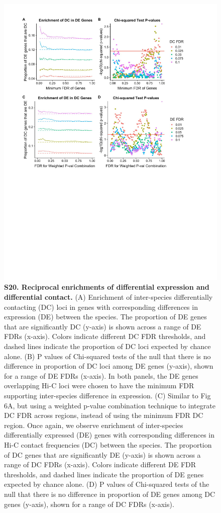 \begin{figure}[!htb]
\centering
\includegraphics[width=5in]{img/figS20.pdf}
\caption[Reciprocal enrichments of differential expression and differential contact.]{\textbf{S20. Reciprocal enrichments of differential expression and differential contact.} (A) Enrichment of inter-species differentially contacting (DC) loci in genes with corresponding differences in expression (DE) between the species. The proportion of DE genes that are significantly DC (y-axis) is shown across a range of DE FDRs (x-axis). Colors indicate different DC FDR thresholds, and dashed lines indicate the proportion of DC loci expected by chance alone. (B) P values of Chi-squared tests of the null that there is no difference in proportion of DC loci among DE genes (y-axis), shown for a range of DE FDRs (x-axis). In both panels, the DE genes overlapping Hi-C loci were chosen to have the minimum FDR supporting inter-species difference in expression. (C) Similar to Fig 6A, but using a weighted p-value combination technique \cite{Whitlock.2005} to integrate DC FDR across regions, instead of using the minimum FDR DC region. Once again, we observe enrichment of inter-species differentially expressed (DE) genes with corresponding differences in Hi-C contact frequencies (DC) between the species. The proportion of DC genes that are significantly DE (y-axis) is shown across a range of DC FDRs (x-axis). Colors indicate different DE FDR thresholds, and dashed lines indicate the proportion of DE genes expected by chance alone. (D) P values of Chi-squared tests of the null that there is no difference in proportion of DE genes among DC genes (y-axis), shown for a range of DC FDRs (x-axis).}
\label{fig:ch02-figS20}
\end{figure}

